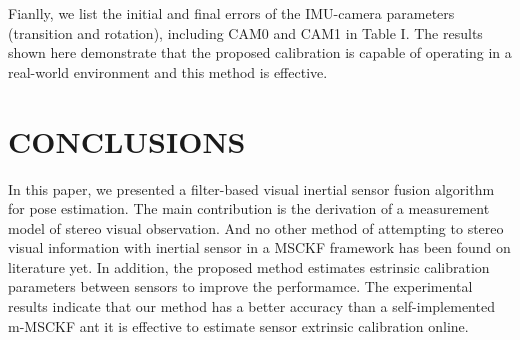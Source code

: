 \documentclass[a4paper, 10pt, conference]{ieeeconf}      %
\begin{document}

 Fianlly, we list the initial and final errors of the IMU-camera parameters (transition and rotation), including CAM0 and CAM1 in Table I. The results shown here demonstrate that the proposed calibration is capable of operating in a real-world environment and this method is effective.



\section{CONCLUSIONS}
In this paper, we presented a filter-based visual inertial sensor fusion algorithm for pose estimation. The main contribution is the derivation of a measurement model of stereo visual observation. And no other method
of attempting to stereo visual information with inertial
sensor in a MSCKF framework has been found on literature yet. In addition, the proposed method estimates estrinsic calibration parameters between sensors to improve the performamce. The experimental results indicate that our method has a better accuracy than a self-implemented m-MSCKF ant it is effective to estimate sensor extrinsic calibration online.
\end{document}
